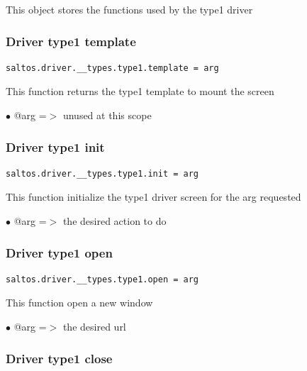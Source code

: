 \documentclass[a4paper]{article}
\begin{document}
This object stores the functions used by the type1 driver

\hypertarget{toc183}{}
\subsubsection{Driver type1 template}

\begin{lstlisting}
saltos.driver.__types.type1.template = arg
\end{lstlisting}

This function returns the type1 template to mount the screen

\begin{compactitem}
\item[\color{myblue}$\bullet$] @arg =$>$ unused at this scope
\end{compactitem}

\hypertarget{toc184}{}
\subsubsection{Driver type1 init}

\begin{lstlisting}
saltos.driver.__types.type1.init = arg
\end{lstlisting}

This function initialize the type1 driver screen for the arg requested

\begin{compactitem}
\item[\color{myblue}$\bullet$] @arg =$>$ the desired action to do
\end{compactitem}

\hypertarget{toc185}{}
\subsubsection{Driver type1 open}

\begin{lstlisting}
saltos.driver.__types.type1.open = arg
\end{lstlisting}

This function open a new window

\begin{compactitem}
\item[\color{myblue}$\bullet$] @arg =$>$ the desired url
\end{compactitem}

\hypertarget{toc186}{}
\subsubsection{Driver type1 close}
\end{document}
